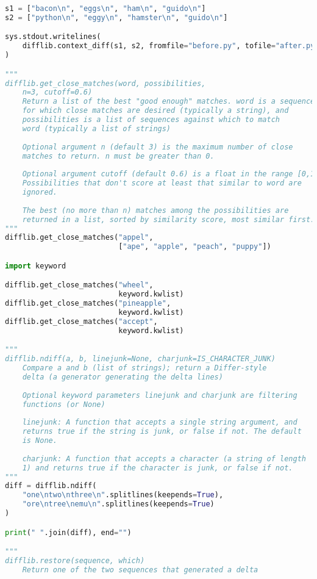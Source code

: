 \documentclass[a4paper,landscape]{report}
\begin{document}
\begin{lstlisting}[language=Python]
s1 = ["bacon\n", "eggs\n", "ham\n", "guido\n"]
s2 = ["python\n", "eggy\n", "hamster\n", "guido\n"]

sys.stdout.writelines(
    difflib.context_diff(s1, s2, fromfile="before.py", tofile="after.py")
)

"""
difflib.get_close_matches(word, possibilities,
    n=3, cutoff=0.6)
    Return a list of the best "good enough" matches. word is a sequence
    for which close matches are desired (typically a string), and
    possibilities is a list of sequences against which to match
    word (typically a list of strings)
    
    Optional argument n (default 3) is the maximum number of close 
    matches to return. n must be greater than 0.
    
    Optional argument cutoff (default 0.6) is a float in the range [0,1]
    Possibilities that don't score at least that similar to word are
    ignored.
    
    The best (no more than n) matches among the possibilities are 
    returned in a list, sorted by similarity score, most similar first.
"""
difflib.get_close_matches("appel",
                          ["ape", "apple", "peach", "puppy"])

import keyword

difflib.get_close_matches("wheel",
                          keyword.kwlist)
difflib.get_close_matches("pineapple",
                          keyword.kwlist)
difflib.get_close_matches("accept",
                          keyword.kwlist)

"""
difflib.ndiff(a, b, linejunk=None, charjunk=IS_CHARACTER_JUNK)
    Compare a and b (list of strings); return a Differ-style
    delta (a generator generating the delta lines)
    
    Optional keyword parameters linejunk and charjunk are filtering
    functions (or None)
    
    linejunk: A function that accepts a single string argument, and
    returns true if the string is junk, or false if not. The default
    is None.
    
    charjunk: A function that accepts a character (a string of length
    1) and returns true if the character is junk, or false if not.
"""
diff = difflib.ndiff(
    "one\ntwo\nthree\n".splitlines(keepends=True),
    "ore\ntree\nemu\n".splitlines(keepends=True)
)

print(" ".join(diff), end="")

"""
difflib.restore(sequence, which)
    Return one of the two sequences that generated a delta
    

\end{lstlisting}
\end{document}
